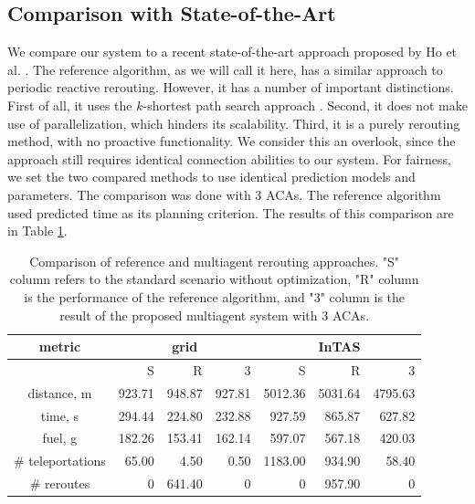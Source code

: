 \documentclass[sigconf]{aamas}
\begin{document}
\subsection{Comparison with State-of-the-Art}
We compare our system to a recent state-of-the-art approach proposed by Ho et al. \cite{reference}. The reference algorithm, as we will call it here, has a similar approach to periodic reactive rerouting. However, it has a number of important distinctions. First of all, it uses the $k$-shortest path search approach \cite{kSP}. Second, it does not make use of parallelization, which hinders its scalability. Third, it is a purely rerouting method, with no proactive functionality. We consider this an overlook, since the approach still requires identical connection abilities to our system. For fairness, we set the two compared methods to use identical prediction models and parameters. The comparison was done with 3 ACAs. The reference algorithm used predicted time as its planning criterion. The results of this comparison are in Table \ref{tab:comparison}.

\begin{table}
    \centering
    \begin{tabular}{crrrrrr}
    \toprule
        metric & \multicolumn{3}{c}{grid} & \multicolumn{3}{c}{InTAS}\\
        \midrule
         & S & R & 3 & S & R & 3 \\
         distance, m& 923.71 & 948.87 & 927.81 & 5012.36& 5031.64& 4795.63\\
         time, s& 294.44 & 224.80 & 232.88 & 927.59& 865.87& 627.82\\
         fuel, g& 182.26 & 153.41 & 162.14 & 597.07& 567.18& 420.03\\
         \# teleportations& 65.00 & 4.50 & 0.50 & 1183.00 & 934.90 & 58.40 \\
         \# reroutes& 0 & 641.40 & 0 & 0 & 957.90 & 0\\
         \bottomrule
    \end{tabular}
    \caption{Comparison of reference and multiagent rerouting approaches. "S" column refers to the standard scenario without optimization, "R" column is the performance of the reference algorithm, and "3" column is the result of the proposed multiagent system with 3 ACAs.}
    \label{tab:comparison}
\end{table}
\end{document}
